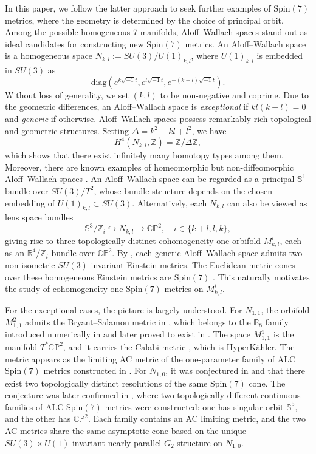 \documentclass[11pt,letterpaper]{amsart}
\theoremstyle{definition}
\numberwithin{equation}{section}
\newcommand{\spin}{\mathrm{Spin}}
\newcommand{\diag}{\mathrm{diag}}
\begin{document}
In this paper, we follow the latter approach to seek further examples of $\spin(7)$ metrics, where the geometry is determined by the choice of principal orbit. Among the possible homogeneous 7-manifolds, Aloff--Wallach spaces stand out as ideal candidates for constructing new $\spin(7)$ metrics. An Aloff--Wallach space is a homogeneous space $N_{k,l}:=SU(3)/U(1)_{k,l}$, where $U(1)_{k,l}$ is embedded in $SU(3)$ as $$\diag\left(e^{k\sqrt{-1}t},e^{l\sqrt{-1}t},e^{-(k+l)\sqrt{-1}t}\right).$$ Without loss of generality, we set $(k,l)$ to be non-negative and coprime. Due to the geometric differences, an Aloff--Wallach space is \emph{exceptional} if  $kl(k-l)= 0$ and \emph{generic} if otherwise. Aloff--Wallach spaces possess remarkably rich topological and geometric structures. Setting $\Delta=k^2+kl+l^2$, we have 
$$
H^4(N_{k,l},\mathbb{Z})=\mathbb{Z}/\Delta\mathbb{Z},
$$
which shows that there exist infinitely many homotopy types among them. Moreover, there are known examples of homeomorphic but non-diffeomorphic Aloff--Wallach spaces \cite{kreck1991some}. An Aloff--Wallach space can be regarded as a principal $\mathbb{S}^1$-bundle over $SU(3)/T^2$, whose bundle structure depends on the chosen embedding of $U(1)_{k,l}\subset SU(3)$. Alternatively, each $N_{k,l}$ can also be viewed as lens space bundles
$$\mathbb{S}^3/\mathbb{Z}_i\hookrightarrow N_{k,l}\rightarrow \mathbb{CP}^2,\quad i\in\{k + l,l,k\},$$
giving rise to three topologically distinct cohomogeneity one orbifold $M_{k,l}^{i}$, each as an $\mathbb{R}^4/\mathbb{Z}_i$-bundle over $\mathbb{CP}^2$. By \cite{wang_some_1982, castellani1984n, page1984new, kowalski_homogeneous_1993}, each generic Aloff--Wallach space admits two non-isometric $SU(3)$-invariant Einstein metrics. The Euclidean metric cones over these homogeneous Einstein metrics are $\spin(7)$ \cite{bar1993real}. This naturally motivates the study of cohomogeneity one $\spin(7)$ metrics on $M_{k,l}^i$.

For the exceptional cases, the picture is largely understood. For $N_{1,1}$, the orbifold $M_{1,1}^2$ admits the Bryant--Salamon metric in \cite{bryant_construction_1989}, which belongs to the $\mathbb{B}_8$ family introduced numerically in \cite{cvetic_cohomogeneity_2002} and later proved to exist in \cite{bazaikin_new_2007,bazaikin_noncompact_2008}. The space $M_{1,1}^1$ is the manifold $T^*\mathbb{CP}^2$, and it carries the Calabi metric \cite{calabi1979metriques}, which is HyperK\"ahler. The metric appears as the limiting AC metric of the one-parameter family of ALC $\spin(7)$ metrics constructed in \cite{chi2022spin}. For $N_{1,0}$, it was conjectured in \cite{cvetic_cohomogeneity_2002} and \cite{gukov2003conifold} that there exist two topologically distinct resolutions of the same $\spin(7)$ cone. The conjecture was later confirmed in \cite{lehmann2022geometric}, where two topologically different continuous families of ALC $\spin(7)$ metrics were constructed: one has singular orbit $\mathbb{S}^5$, and the other has $\mathbb{CP}^2$. Each family contains an AC limiting metric, and the two AC metrics share the same asymptotic cone based on the unique $SU(3)\times U(1)$-invariant nearly parallel $G_2$ structure on $N_{1,0}$.
\end{document}
